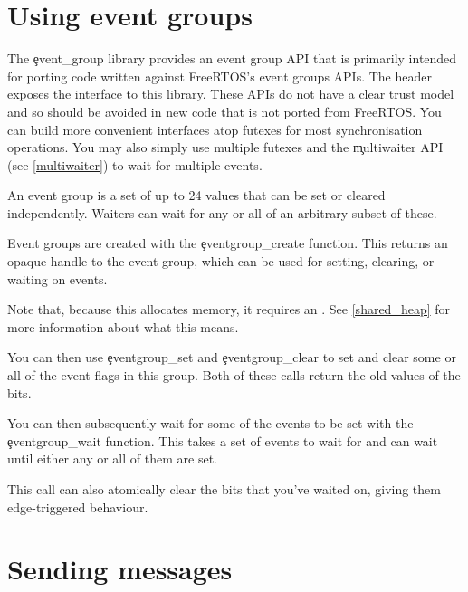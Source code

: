 \section{Using event groups}

The \c{event_group} library provides an event group API that is primarily intended for porting code written against FreeRTOS's event groups APIs.
The  header exposes the interface to this library.
These APIs do not have a clear trust model and so should be avoided in new code that is not ported from FreeRTOS.
You can build more convenient interfaces atop futexes for most synchronisation operations.
You may also simply use multiple futexes and the \c{multiwaiter} API (see \ref{multiwaiter}) to wait for multiple events.

An event group is a set of up to 24 values that can be set or cleared independently.
Waiters can wait for any or all of an arbitrary subset of these.

Event groups are created with the \c{eventgroup_create} function.
This returns an opaque handle to the event group, which can be used for setting, clearing, or waiting on events.


Note that, because this allocates memory, it requires an .
See \ref{shared_heap} for more information about what this means.

You can then use \c{eventgroup_set} and \c{eventgroup_clear} to set and clear some or all of the event flags in this group.
Both of these calls return the old values of the bits.



You can then subsequently wait for some of the events to be set with the \c{eventgroup_wait} function.
This takes a set of events to wait for and can wait until either any or all of them are set.


This call can also atomically clear the bits that you've waited on, giving them edge-triggered behaviour.

\section[label=message_queue]{Sending messages}

